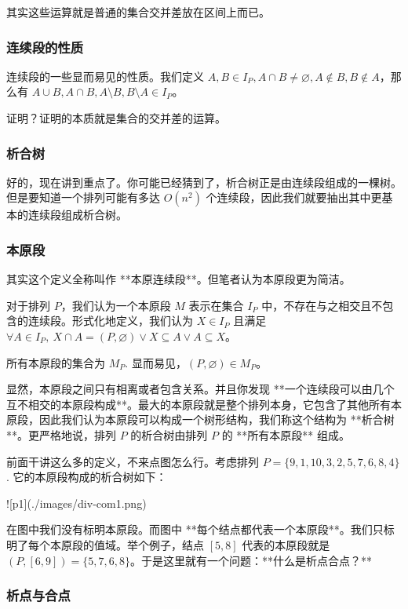 \documentclass{ctexart}
\begin{document}
其实这些运算就是普通的集合交并差放在区间上而已。

\subsubsection{连续段的性质}

连续段的一些显而易见的性质。我们定义 $A,B\in I_P,A \cap B \neq \varnothing,A \notin B,B \notin A$，那么有 $A\cup B,A\cap B,A\setminus B,B\setminus A\in I_P$。

证明？证明的本质就是集合的交并差的运算。

\subsubsection{析合树}

好的，现在讲到重点了。你可能已经猜到了，析合树正是由连续段组成的一棵树。但是要知道一个排列可能有多达 $O(n^2)$ 个连续段，因此我们就要抽出其中更基本的连续段组成析合树。

\subsubsection{本原段}

其实这个定义全称叫作 **本原连续段**。但笔者认为本原段更为简洁。

对于排列 $P$，我们认为一个本原段 $M$ 表示在集合 $I_P$ 中，不存在与之相交且不包含的连续段。形式化地定义，我们认为 $X\in I_P$ 且满足 $\forall A\in I_P,\ X\cap A= (P,\varnothing)\vee X\subseteq A\vee A\subseteq X$。

所有本原段的集合为 $M_P$. 显而易见，$(P,\varnothing)\in M_P$。

显然，本原段之间只有相离或者包含关系。并且你发现 **一个连续段可以由几个互不相交的本原段构成**。最大的本原段就是整个排列本身，它包含了其他所有本原段，因此我们认为本原段可以构成一个树形结构，我们称这个结构为 **析合树**。更严格地说，排列 $P$ 的析合树由排列 $P$ 的 **所有本原段** 组成。

前面干讲这么多的定义，不来点图怎么行。考虑排列 $P=\{9,1,10,3,2,5,7,6,8,4\}$. 它的本原段构成的析合树如下：

![p1](./images/div-com1.png)

在图中我们没有标明本原段。而图中 **每个结点都代表一个本原段**。我们只标明了每个本原段的值域。举个例子，结点 $[5,8]$ 代表的本原段就是 $(P,[6,9])=\{5,7,6,8\}$。于是这里就有一个问题：**什么是析点合点？**

\subsubsection{析点与合点}
\end{document}
